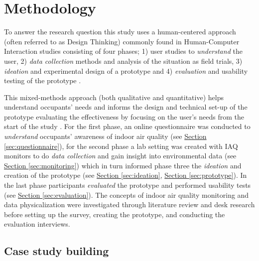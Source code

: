 \section{Methodology}
\label{sec:methodology}

To answer the research question this study uses a human-centered approach (often referred to as Design Thinking) commonly found in Human-Computer Interaction studies consisting of four phases; 1) user studies to \textit{understand} the user, 2) \textit{data collection} methods and analysis of the situation as field trials, 3) \textit{ideation} and experimental design of a prototype and 4) \textit{evaluation} and usability testing of the prototype \cite{jonathan_lazar_research_2017, zimmerman_research_2007}.

This mixed-methods approach (both qualitative and quantitative) helps understand occupants' needs and informs the design and technical set-up of the prototype evaluating the effectiveness by focusing on the user's needs from the start of the study \cite{rogers_moving_2017, experience_ux_2024}. For the first phase, an online questionnaire was conducted to \textit{understand} occupants' awareness of indoor air quality (see \hyperref[sec:questionnaire]{Section \ref*{sec:questionnaire}}), for the second phase a lab setting was created with IAQ monitors to do \textit{data collection} and gain insight into environmental data (see \hyperref[sec:monitoring]{Section \ref*{sec:monitoring}}) which in turn informed phase three the \textit{ideation} and creation of the prototype (see \hyperref[sec:ideation]{Section \ref*{sec:ideation}}, \hyperref[sec:prototype]{Section \ref*{sec:prototype}}). In the last phase participants \textit{evaluated} the prototype and performed usability tests (see \hyperref[sec:evaluation]{Section \ref*{sec:evaluation}}). The concepts of indoor air quality monitoring and data physicalization were investigated through literature review and desk research before setting up the survey, creating the prototype, and conducting the evaluation interviews.

\subsection{Case study building}

